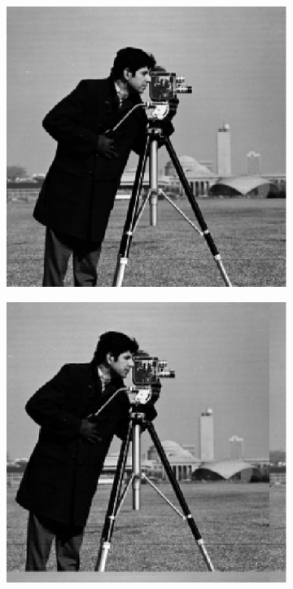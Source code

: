\begin{figure}[htb!]
    \centering
    \begin{subfigure}{.2\textwidth}
        \centering
        \includegraphics[width=\textwidth]{./img/im1.pdf}
        \caption{}
        \label{fig:cameraman2_1}
    \end{subfigure}
    \begin{subfigure}{.2\textwidth}
        \centering
        \includegraphics[width=\textwidth]{./img/im2.pdf}
        \caption{}
        \label{fig:cameraman2_2}
    \end{subfigure}


\end{figure}

